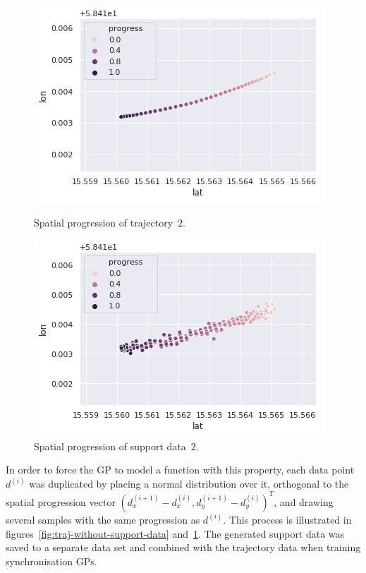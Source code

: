 \begin{figure}[H]
  \begin{minipage}{.46\textwidth}
    \includegraphics[scale=0.48,width=\textwidth]{figures/traj-without-support-data2.png}
    \caption{Spatial progression of trajectory~2.}
    \label{fig:traj-without-support-data}
  \end{minipage}
  \hspace{5pt}
  \begin{minipage}{.46\textwidth}
    \includegraphics[scale=0.5,width=\textwidth]{figures/traj-with-support-data2.png}
    \caption{Spatial progression of support data~2.}
    \label{fig:traj-with-support-data}
  \end{minipage}
\end{figure}

\noindent
In order to force the GP to model a function with this property, each data point $d^{(i)}$ was duplicated by placing a normal distribution over it, orthogonal to the spatial progression vector ${(d^{(i+1)}_x - d^{(i)}_x, d^{(i+1)}_y - d^{(i)}_y)}^T$, and drawing several samples with the same progression as $d^{(i)}$. This process is illustrated in figures~\ref{fig:traj-without-support-data} and~\ref{fig:traj-with-support-data}. The generated support data was saved to a separate data set and combined with the trajectory data when training synchronisation GPs.

